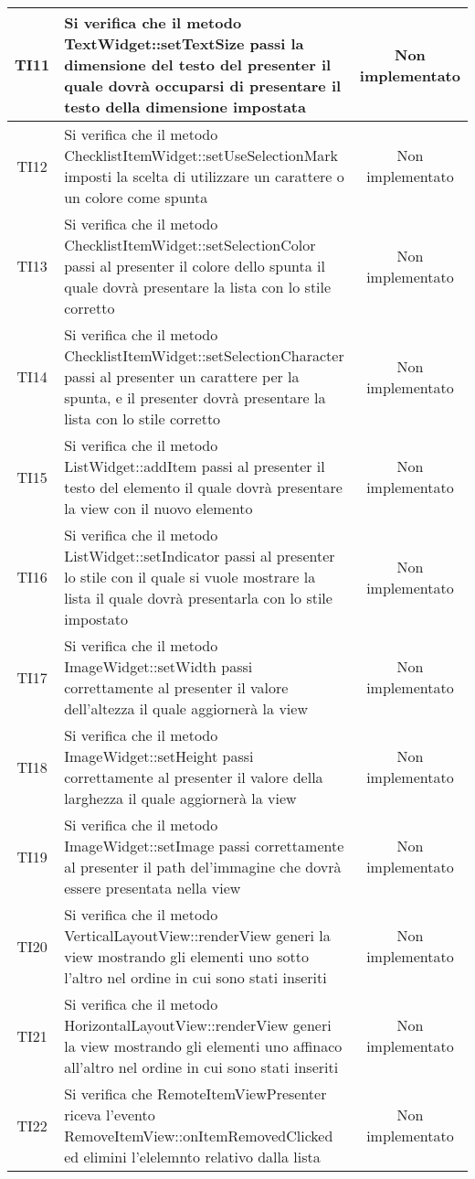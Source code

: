 \begin{center}
\begin{longtable}{|c|>{\centering}m{10cm}|c|}
		TI11 & Si verifica che il metodo TextWidget::setTextSize passi la dimensione del testo del presenter il quale dovrà occuparsi di presentare il testo della dimensione impostata & Non implementato \\ \hline
		TI12 & Si verifica che il metodo ChecklistItemWidget::setUseSelectionMark imposti la scelta di utilizzare un carattere o un colore come spunta & Non implementato \\ \hline
		TI13 & Si verifica che il metodo ChecklistItemWidget::setSelectionColor passi al presenter il colore dello spunta il quale dovrà presentare la lista con lo stile corretto & Non implementato \\ \hline
		TI14 & Si verifica che il metodo ChecklistItemWidget::setSelectionCharacter passi al presenter un carattere per la spunta, e il presenter dovrà presentare la lista con lo stile corretto & Non implementato \\ \hline
		TI15 & Si verifica che il metodo ListWidget::addItem passi al presenter il testo del elemento il quale dovrà presentare la view con il nuovo elemento & Non implementato \\ \hline
		TI16 & Si verifica che il metodo ListWidget::setIndicator passi al presenter lo stile con il quale si vuole mostrare la lista il quale dovrà presentarla con lo stile impostato & Non implementato \\ \hline
		TI17 & Si verifica che il metodo ImageWidget::setWidth passi correttamente al presenter il valore dell'altezza il quale aggiornerà la view & Non implementato \\ \hline
		TI18 & Si verifica che il metodo ImageWidget::setHeight passi correttamente al presenter il valore della larghezza il quale aggiornerà la view & Non implementato \\ \hline
		TI19 & Si verifica che il metodo ImageWidget::setImage passi correttamente al presenter il path del'immagine che dovrà essere presentata nella view & Non implementato \\ \hline
		TI20 & Si verifica che il metodo VerticalLayoutView::renderView generi la view mostrando gli elementi uno sotto l'altro nel ordine in cui sono stati inseriti & Non implementato \\ \hline
		TI21 & Si verifica che il metodo HorizontalLayoutView::renderView generi la view mostrando gli elementi uno affinaco all'altro nel ordine in cui sono stati inseriti & Non implementato \\ \hline
		TI22 & Si verifica che RemoteItemViewPresenter riceva l'evento RemoveItemView::onItemRemovedClicked ed elimini l'elelemnto relativo dalla lista & Non implementato \\ \hline

\end{longtable}
\end{center}
